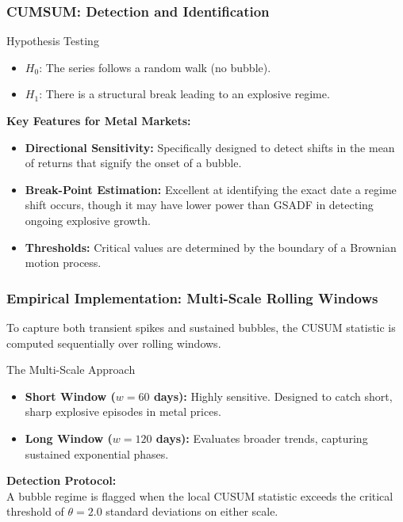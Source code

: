 \documentclass{beamer}
\begin{document}
\begin{frame}
\frametitle{CUMSUM: Detection and Identification}
    \begin{block}{Hypothesis Testing}
        \begin{itemize}
            \item \textbf{$H_0$}: The series follows a random walk (no bubble).
            \item \textbf{$H_1$}: There is a structural break leading to an explosive regime.
        \end{itemize}
    \end{block}

    \textbf{Key Features for Metal Markets:}
    \begin{itemize}
        \item \textbf{Directional Sensitivity:} Specifically designed to detect shifts in the mean of returns that signify the onset of a bubble.
        \item \textbf{Break-Point Estimation:} Excellent at identifying the exact date a regime shift occurs, though it may have lower power than GSADF in detecting ongoing explosive growth.
        \item \textbf{Thresholds:} Critical values are determined by the boundary of a Brownian motion process.
    \end{itemize}
\end{frame}

\begin{frame}
\frametitle{Empirical Implementation: Multi-Scale Rolling Windows}
    To capture both transient spikes and sustained bubbles, the CUSUM statistic is computed sequentially over rolling windows.

    \vspace{0.3cm}
    \begin{block}{The Multi-Scale Approach}
        \begin{itemize}
            \item \textbf{Short Window ($w = 60$ days):} Highly sensitive. Designed to catch short, sharp explosive episodes in metal prices.
            \item \textbf{Long Window ($w = 120$ days):} Evaluates broader trends, capturing sustained exponential phases.
        \end{itemize}
    \end{block}

    \vspace{0.2cm}
    \textbf{Detection Protocol:}\\
    A bubble regime is flagged when the local CUSUM statistic exceeds the critical threshold of $\theta = 2.0$ standard deviations on either scale.
\end{frame}
\end{document}
